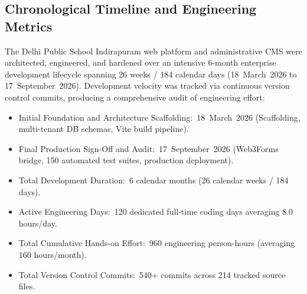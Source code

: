 \documentclass[12pt, a4paper, oneside]{report}
\def\textbf#1{#1}
\def\&{and}
\begin{document}
\subsection{Chronological Timeline and Engineering Metrics}

The Delhi Public School Indirapuram web platform and administrative CMS were
architected, engineered, and hardened over an intensive \textbf{6-month enterprise development
lifecycle} spanning \textbf{26 weeks / 184 calendar days} (18~March~2026 to 17~September~2026).
Development velocity was tracked via continuous version control commits, producing
a comprehensive audit of engineering effort:

\begin{itemize}
  \item \textbf{Initial Foundation \& Architecture Scaffolding:}\ 18~March~2026 (Scaffolding, multi-tenant DB schemas, Vite build pipeline).
  \item \textbf{Final Production Sign-Off \& Audit:}\ 17~September~2026 (Web3Forms bridge, 150 automated test suites, production deployment).
  \item \textbf{Total Development Duration:}\ \textbf{6 calendar months} (26 calendar weeks / 184 days).
  \item \textbf{Active Engineering Days:}\ \textbf{120 dedicated full-time coding days} averaging 8.0 hours/day.
  \item \textbf{Total Cumulative Hands-on Effort:}\ \textbf{960 engineering person-hours} (averaging 160 hours/month).
  \item \textbf{Total Version Control Commits:}\ \textbf{540+ commits} across \textbf{214 tracked source files}.
\end{itemize}
\end{document}
